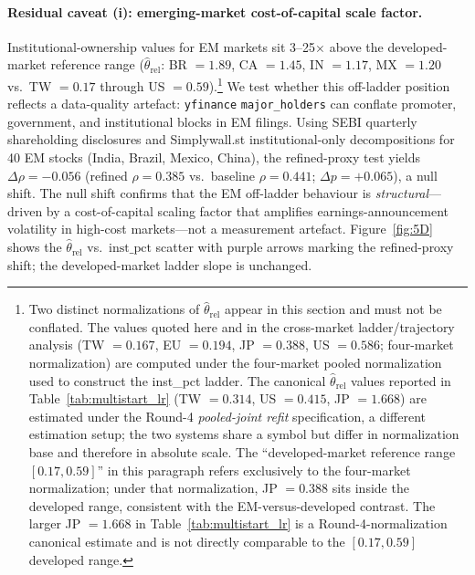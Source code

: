 \documentclass[12pt,a4paper]{article}
\begin{document}
\paragraph{Residual caveat (i): emerging-market cost-of-capital scale factor.}
Institutional-ownership values for EM markets sit 3--25$\times$ above the developed-market
reference range ($\hat{\theta}_{\mathrm{rel}}$: BR $= 1.89$, CA $= 1.45$, IN $= 1.17$,
MX $= 1.20$ vs.\ TW $= 0.17$ through US $= 0.59$).\footnote{%
Two distinct normalizations of $\hat{\theta}_{\mathrm{rel}}$ appear in this section
and must not be conflated. The values quoted here and in the cross-market
ladder/trajectory analysis (TW $= 0.167$, EU $= 0.194$, JP $= 0.388$, US $= 0.586$;
four-market normalization) are computed under the four-market
pooled normalization used to construct the inst\_pct ladder.
The canonical $\hat{\theta}_{\mathrm{rel}}$ values reported in
Table~\ref{tab:multistart_lr} (TW $= 0.314$, US $= 0.415$, JP $= 1.668$)
are estimated under the Round-4 \emph{pooled-joint refit} specification, a different
estimation setup; the two systems share a symbol but differ in normalization base and
therefore in absolute scale. The ``developed-market reference range $[0.17, 0.59]$''
in this paragraph refers exclusively to the four-market normalization; under that
normalization, JP $= 0.388$ sits inside the developed range, consistent with the
EM-versus-developed contrast. The larger JP $= 1.668$ in Table~\ref{tab:multistart_lr}
is a Round-4-normalization canonical estimate and is not directly comparable to the
$[0.17, 0.59]$ developed range.
}
We test whether this off-ladder position reflects a data-quality artefact:
\texttt{yfinance} \texttt{major\_holders} can conflate promoter, government, and
institutional blocks in EM filings.
Using SEBI quarterly shareholding disclosures and Simplywall.st institutional-only
decompositions for 40 EM stocks (India, Brazil, Mexico, China), the refined-proxy test
yields $\Delta\rho = -0.056$ (refined $\rho = 0.385$ vs.\ baseline $\rho = 0.441$;
$\Delta p = +0.065$), a null shift.
The null shift confirms that the EM off-ladder behaviour is \emph{structural}---driven by
a cost-of-capital scaling factor that amplifies earnings-announcement volatility in
high-cost markets---not a measurement artefact.
Figure~\ref{fig:5D} shows the $\hat{\theta}_{\mathrm{rel}}$ vs.\ $\mathrm{inst\_pct}$
scatter with purple arrows marking the refined-proxy shift; the developed-market
ladder slope is unchanged.
\end{document}
